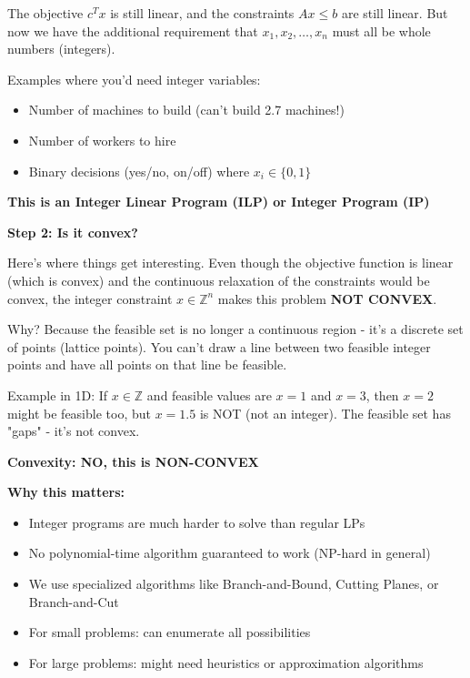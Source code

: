 \documentclass[11pt]{article}
\newenvironment{answerbox}
  {\begin{framed}\begin{center}\large\bfseries}
  {\end{center}\end{framed}}
\begin{document}
The objective $c^T x$ is still linear, and the constraints $Ax \leq b$ are still linear. But now we have the additional requirement that $x_1, x_2, \ldots, x_n$ must all be whole numbers (integers).

Examples where you'd need integer variables:
\begin{itemize}
\item Number of machines to build (can't build 2.7 machines!)
\item Number of workers to hire
\item Binary decisions (yes/no, on/off) where $x_i \in \{0,1\}$
\end{itemize}

\begin{answerbox}
This is an \textbf{Integer Linear Program (ILP)} or \textbf{Integer Program (IP)}
\end{answerbox}

\vspace{0.5em}

\textbf{Step 2: Is it convex?}

Here's where things get interesting. Even though the objective function is linear (which is convex) and the continuous relaxation of the constraints would be convex, the integer constraint $x \in \mathbb{Z}^n$ makes this problem \textbf{NOT CONVEX}.

Why? Because the feasible set is no longer a continuous region - it's a discrete set of points (lattice points). You can't draw a line between two feasible integer points and have all points on that line be feasible.

Example in 1D: If $x \in \mathbb{Z}$ and feasible values are $x = 1$ and $x = 3$, then $x = 2$ might be feasible too, but $x = 1.5$ is NOT (not an integer). The feasible set has "gaps" - it's not convex.

\begin{answerbox}
\textbf{Convexity:} NO, this is \textbf{NON-CONVEX}
\end{answerbox}

\textbf{Why this matters:}

\begin{itemize}
\item Integer programs are much harder to solve than regular LPs
\item No polynomial-time algorithm guaranteed to work (NP-hard in general)
\item We use specialized algorithms like Branch-and-Bound, Cutting Planes, or Branch-and-Cut
\item For small problems: can enumerate all possibilities
\item For large problems: might need heuristics or approximation algorithms
\end{itemize}
\end{document}
